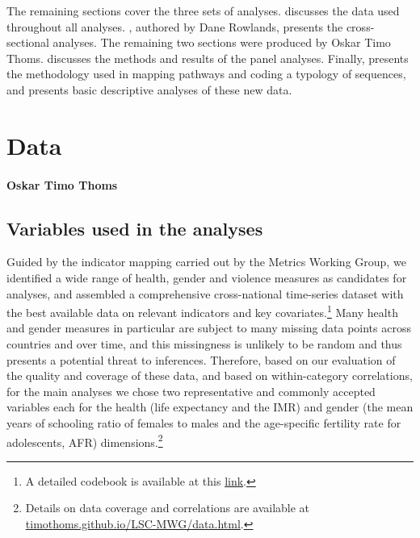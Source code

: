 \documentclass[12pt]{article}
\begin{document}
The remaining sections cover the three sets of analyses.
 discusses the data used throughout all analyses.
, authored by Dane Rowlands, presents the cross-sectional analyses.
The remaining two sections were produced by Oskar Timo Thoms.
 discusses the methods and results of the panel analyses.
Finally,  presents the methodology used in mapping pathways and coding a typology of sequences, and presents basic descriptive analyses of these new data.


\clearpage
\section{Data}
\label{data}
\paragraph{Oskar Timo Thoms}

\subsection{Variables used in the analyses}
\label{variables}

Guided by the indicator mapping carried out by the Metrics Working Group, we identified a wide range of health, gender and violence measures as candidates for analyses, and assembled a comprehensive cross-national time-series dataset with the best available data on relevant indicators and key covariates.\footnote{
A detailed codebook is available at this \href{https://docs.google.com/spreadsheets/d/1KLFTva--XHVBM-IX6qaPtuyzmIlRMnpyjUXfBdJPsag/edit?usp=sharing}{link}.}
Many health and gender measures in particular are subject to many missing data points across countries and over time, and this missingness is unlikely to be random and thus presents a potential threat to inferences. Therefore, based on our evaluation of the quality and coverage of these data, and based on within-category correlations, for the main analyses we chose two representative and commonly accepted variables each for the health (life expectancy and the IMR) and gender (the mean years of schooling ratio of females to males and the age-specific fertility rate for adolescents, AFR) dimensions.\footnote{
Details on data coverage and correlations are available at \href{https://timothoms.github.io/LSC-MWG/}{timothoms.github.io/LSC-MWG/data.html}.}
\end{document}
